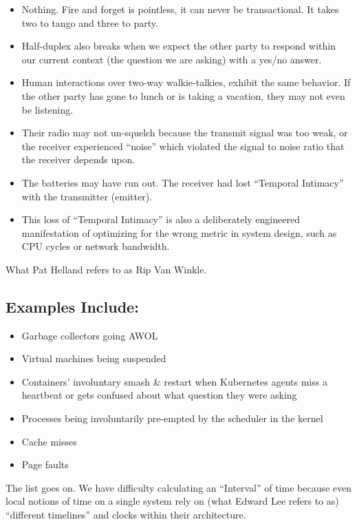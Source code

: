 \documentclass[../../../OAE-SPEC-MAIN.tex]{subfiles}
\begin{document}
\begin{itemize}
  \item Nothing. Fire and forget is pointless, it can never be transactional. It takes two to tango and three to party.
  \item Half-duplex also breaks when we expect the other party to respond within our current context (the question we are asking) with a yes/no answer. 
  \item Human interactions over two-way walkie-talkies, exhibit the same behavior. If the other party has gone to lunch or is taking a vacation, they may not even be listening. 
  \item Their radio may not un-squelch because the transmit signal was too weak, or the receiver experienced  “noise” which violated the signal to noise ratio that the receiver depends upon. 
  \item The batteries may have run out. The receiver had lost “Temporal Intimacy” with the transmitter (emitter). 
  \item This loss of “Temporal Intimacy” is also a deliberately engineered manifestation of optimizing  for the wrong metric in system design, such as CPU cycles or network bandwidth.
\end{itemize}

What Pat Helland refers to as Rip Van Winkle.

\subsection{Examples Include:}
\begin{itemize}
  \item Garbage collectors going AWOL
  \item Virtual machines being suspended
  \item Containers’ involuntary smash \& restart when Kubernetes agents miss a heartbeat or gets confused about what question they were asking
  \item Processes being involuntarily pre-empted by the scheduler in the kernel
  \item Cache misses
  \item Page faults
\end{itemize}

The list goes on. We have difficulty calculating an “Interval” of time because even local notions of time on a single system rely on (what Edward Lee refers to as) “different timelines” and clocks within their architecture.
\end{document}
